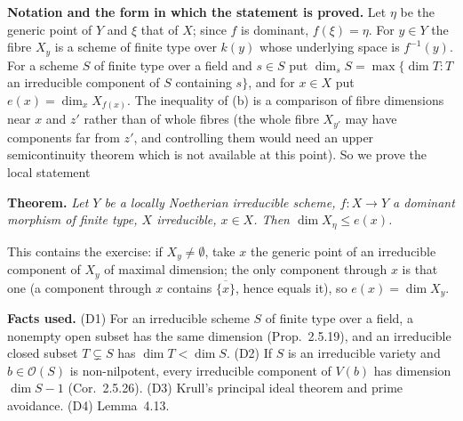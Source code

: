\documentclass[11pt]{article}
\begin{document}
\pf
\textbf{Notation and the form in which the statement is proved.} Let $\eta$ be the generic point of $Y$ and $\xi$ that of $X$; since $f$ is dominant, $f(\xi)=\eta$. For $y\in Y$ the fibre $X_y$ is a scheme of finite type over $k(y)$ whose underlying space is $f^{-1}(y)$. For a scheme $S$ of finite type over a field and $s\in S$ put $\dim_sS=\max\{\dim T: T$ an irreducible component of $S$ containing $s\}$, and for $x\in X$ put $e(x)=\dim_xX_{f(x)}$. The inequality of (b) is a comparison of fibre dimensions near $x$ and $z'$ rather than of whole fibres (the whole fibre $X_{y'}$ may have components far from $z'$, and controlling them would need an upper semicontinuity theorem which is not available at this point). So we prove the local statement

\textbf{Theorem.} \emph{Let $Y$ be a locally Noetherian irreducible scheme, $f:X\to Y$ a dominant morphism of finite type, $X$ irreducible, $x\in X$. Then $\dim X_\eta\le e(x)$.}

This contains the exercise: if $X_y\neq\emptyset$, take $x$ the generic point of an irreducible component of $X_y$ of maximal dimension; the only component through $x$ is that one (a component through $x$ contains $\overline{\{x\}}$, hence equals it), so $e(x)=\dim X_y$.

\textbf{Facts used.} (D1) For an irreducible scheme $S$ of finite type over a field, a nonempty open subset has the same dimension (Prop.~2.5.19), and an irreducible closed subset $T\subsetneq S$ has $\dim T<\dim S$. (D2) If $S$ is an irreducible variety and $b\in\mathcal O(S)$ is non-nilpotent, every irreducible component of $V(b)$ has dimension $\dim S-1$ (Cor.~2.5.26). (D3) Krull's principal ideal theorem and prime avoidance. (D4) Lemma~4.13.
\end{document}
